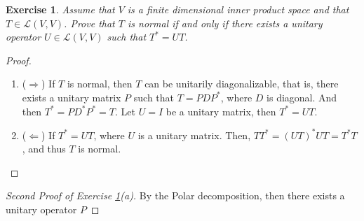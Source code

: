 \documentclass[11pt]{article}
\newtheorem{exercise}{Exercise}[section]
\theoremstyle{definition}
\numberwithin{equation}{subsection}
\begin{document}
\medskip

\begin{exercise}\label{April_2017_5}
Assume that $V$ is a finite dimensional inner product space and that $T \in \mathscr{L}(V, V)$. Prove that $T$ is normal if and only if there exists a unitary operator $U \in \mathscr{L}(V, V)$ such that $T^* = UT$.
\end{exercise}
\begin{proof}
~\begin{enumerate}[label=(\alph*)]
    \item ($\Rightarrow$) If $T$ is normal, then $T$ can be unitarily diagonalizable, that is, there exists a unitary matrix $P$ such that $T = PDP^*$, where $D$ is diagonal. And then $T^* = PD^*P^* = T$. Let $U = I$ be a unitary matrix, then $T^* = UT$.
    
    \item ($\Leftarrow$) If $T^* = UT$, where $U$ is a unitary matrix. Then, $TT^* = (UT)^* UT = T^* T$, and thus $T$ is normal.
\end{enumerate}
\end{proof}

\begin{proof}[Second Proof of Exercise \ref{April_2017_5}(a)]
By the Polar decomposition, then there exists a unitary operator $P$
\end{proof}


















\newpage


\end{document}

